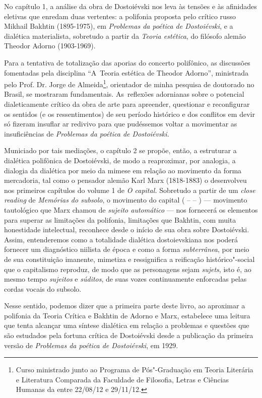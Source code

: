 No capítulo 1, a análise da obra de Dostoiévski nos leva às tensões e às
afinidades eletivas que enredam duas vertentes: a polifonia proposta
pelo crítico russo Mikhail Bakhtin (1895-1975), em \emph{Problemas da
poética de Dostoiévski}, e a dialética materialista, sobretudo a partir
da \emph{Teoria estética}, do filósofo alemão Theodor Adorno
(1903-1969).

Para a tentativa de totalização das aporias do concerto polifônico, as
discussões fomentadas pela disciplina ``A~Teoria estética de Theodor
Adorno'', ministrada pelo Prof. Dr. Jorge de Almeida\footnote{Curso
  ministrado junto ao Programa de Pós"-Graduação em Teoria Literária e
  Literatura Comparada da Faculdade de Filosofia, Letras e Ciências Humanas da  entre 22/08/12 e 29/11/12.}, orientador de minha pesquisa de doutorado no Brasil, se mostraram fundamentais. As~reflexões adornianas sobre o potencial dialeticamente crítico da obra de arte para
apreender, questionar e reconfigurar os sentidos (e os ressentimentos)
de seu período histórico e dos conflitos em devir só fizeram insuflar ar
redivivo para que pudéssemos voltar a movimentar as insuficiências de
\emph{Problemas da poética de Dostoiévski.}

Municiado por tais mediações, o capítulo 2 se propõe, então, a
estruturar a dialética polifônica de Dostoiévski, de modo a reaproximar,
por analogia, a dialogia da dialética por meio da mimese em relação ao
movimento da forma mercadoria, tal como o pensador alemão Karl Marx
(1818-1883) o desenvolveu nos primeiros capítulos do volume 1 de \emph{O
capital.} Sobretudo a partir de um \emph{close reading} de
\emph{Memórias do subsolo}, o movimento do capital ( --  -- ) ---
movimento tautológico que Marx chamou de \emph{sujeito automático} ---
nos fornecerá os elementos para superar as limitações da polifonia,
limitações que Bakhtin, com muita honestidade intelectual, reconhece
desde o início de sua obra sobre Dostoiévski. Assim, entenderemos como a
totalidade dialética dostoievskiana nos poderá fornecer um diagnóstico
niilista de época e como a forma \emph{subterrânea}, por meio de sua
constituição imanente, mimetiza e ressignifica a reificação
histórico"-social que o capitalismo reproduz, de modo que as personagens
sejam \emph{sujets}, isto é, ao mesmo tempo \emph{sujeitos} e
\emph{súditos}, de suas vozes continuamente enforcadas pelas cordas
vocais do subsolo.

Nesse sentido, podemos dizer que a primeira parte deste livro, ao
aproximar a polifonia da Teoria Crítica e Bakhtin de Adorno e Marx,
estabelece uma leitura que tenta alcançar uma síntese dialética em
relação a problemas e questões que são estudados pela fortuna crítica de
Dostoiévski desde a publicação da primeira versão de \emph{Problemas da
poética de Dostoiévski}, em 1929.

